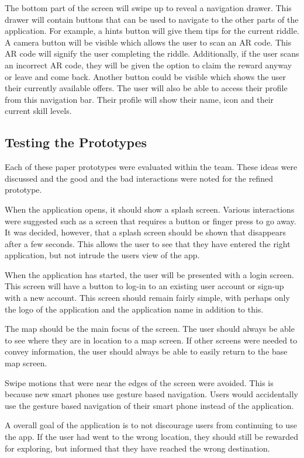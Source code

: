\documentclass[10pt,twocolumn]{article} %
\begin{document}
The bottom part of the screen will swipe up to reveal a navigation drawer. This drawer will contain buttons that can be used to navigate to the other parts of the application. For example, a hints button will give them tips for the current riddle. A camera button will be visible which allows the user to scan an AR code. This AR code will signify the user completing the riddle. Additionally, if the user scans an incorrect AR code, they will be given the option to claim the reward anyway or leave and come back. Another button could be visible which shows the user their currently available offers. The user will also be able to access their profile from this navigation bar. Their profile will show their name, icon and their current skill levels.

\subsection*{Testing the Prototypes}
Each of these paper prototypes were evaluated within the team. These ideas were discussed and the good and the bad interactions were noted for the refined prototype.

When the application opens, it should show a splash screen. Various interactions were suggested such as a screen that requires a button or finger press to go away. It was decided, however, that a splash screen should be shown that disappears after a few seconds. This allows the user to see that they have entered the right application, but not intrude the users view of the app.

When the application has started, the user will be presented with a login screen. This screen will have a button to log-in to an existing user account or sign-up with a new account. This screen should remain fairly simple, with perhaps only the logo of the application and the application name in addition to this.

The map should be the main focus of the screen. The user should always be able to see where they are in location to a map screen. If other screens were needed to convey information, the user should always be able to easily return to the base map screen.

Swipe motions that were near the edges of the screen were avoided. This is because new smart phones use gesture based navigation. Users would accidentally use the gesture based navigation of their smart phone instead of the application.

A overall goal of the application is to not discourage users from continuing to use the app. If the user had went to the wrong location, they should still be rewarded for exploring, but informed that they have reached the wrong destination.
\end{document}
